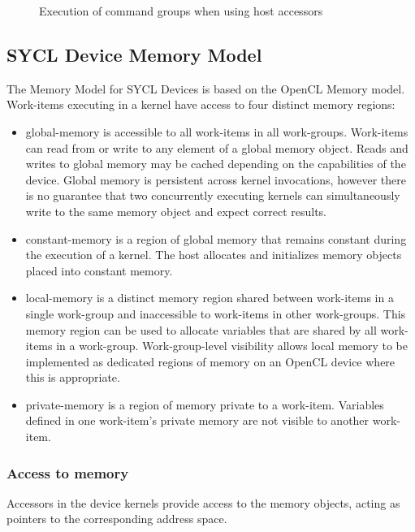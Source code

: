 \begin{figure}[h]
\centering

\caption{Execution of command groups when using host accessors}
\label{fig:host-acc}
\end{figure}

\subsection{SYCL Device Memory Model}

The Memory Model for SYCL Devices is based on the OpenCL Memory model.
Work-items executing in a kernel have access to four distinct memory regions:

\begin{itemize}
    \item \Gls{global-memory} is accessible to all work-items in all
work-groups. Work-items can read from or write to any element of a global memory
object. Reads and writes to global memory may be cached depending on the
capabilities of the device. Global memory is persistent across kernel
invocations, however there is no guarantee that two concurrently executing
kernels can simultaneously write to the same memory object and expect correct
results.

    \item \Gls{constant-memory} is a region of global memory that remains
constant during the execution of a kernel. The host allocates and initializes
memory objects placed into constant memory.

    \item \Gls{local-memory} is a distinct memory region shared between
work-items in a single work-group and inaccessible to work-items in other
work-groups. This memory region can be used to allocate variables that are
shared by all work-items in a work-group. Work-group-level visibility allows
local memory to be implemented as dedicated regions of memory on an OpenCL
device where this is appropriate.

    \item \Gls{private-memory} is a region of memory private to a work-item.
Variables defined in one work-item's private memory are not visible to another
work-item.
\end{itemize}

\subsubsection{Access to memory}

Accessors in the device kernels provide access to the memory objects, 
acting as pointers to the corresponding address space.

